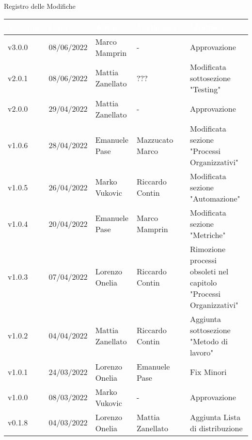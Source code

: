 \begin{center}
  \huge{Registro delle Modifiche}
\end{center}

\renewcommand\arraystretch{1,5}
{\centering
\begin{longtable}{|C{1.8cm}|C{2.1cm}|C{2cm}|C{2.4cm}|L{4.4cm}|}
  \hline
  \textcolor[HTML]{FFFFFF}{\textbf{Versione}} & \textcolor[HTML]{FFFFFF}{\textbf{Data}} & \textcolor[HTML]{FFFFFF}{\textbf{Autore}}  & \textcolor[HTML]{FFFFFF}{\textbf{Verificatore}} & \textcolor[HTML]{FFFFFF}{\textbf{Modifica}}    \\ \hline
  v3.0.0     & 08/06/2022    & Marco Mamprin &  -    & Approvazione     \\ \hline
  v2.0.1     & 08/06/2022    & Mattia Zanellato &  ???    & Modificata sottosezione "Testing"     \\ \hline
  v2.0.0     & 29/04/2022    & Mattia Zanellato &  -    & Approvazione     \\ \hline
  v1.0.6     & 28/04/2022    & Emanuele Pase &  Mazzucato Marco    & Modificata sezione "Processi Organizzativi"               \\ \hline
  v1.0.5     & 26/04/2022    & Marko Vukovic &  Riccardo Contin    & Modificata sezione "Automazione"               \\ \hline
  v1.0.4     & 20/04/2022    & Emanuele Pase &  Marco Mamprin    & Modificata sezione "Metriche"               \\ \hline
  v1.0.3     & 07/04/2022    & Lorenzo Onelia & Riccardo Contin    & Rimozione processi obsoleti nel capitolo "Processi Organizzativi"              \\ \hline
  v1.0.2     & 04/04/2022    & Mattia Zanellato & Riccardo Contin    & Aggiunta sottosezione "Metodo di lavoro"               \\ \hline
  v1.0.1     & 24/03/2022    & Lorenzo Onelia   & Emanuele Pase    & Fix Minori                \\ \hline
  v1.0.0     & 08/03/2022    & Marko Vukovic    & - & Approvazione     \\ \hline
  v0.1.8     & 04/03/2022    & Lorenzo Onelia   & Mattia Zanellato     & Aggiunta Lista di distribuzione                  \\ \hline

\end{longtable}}
